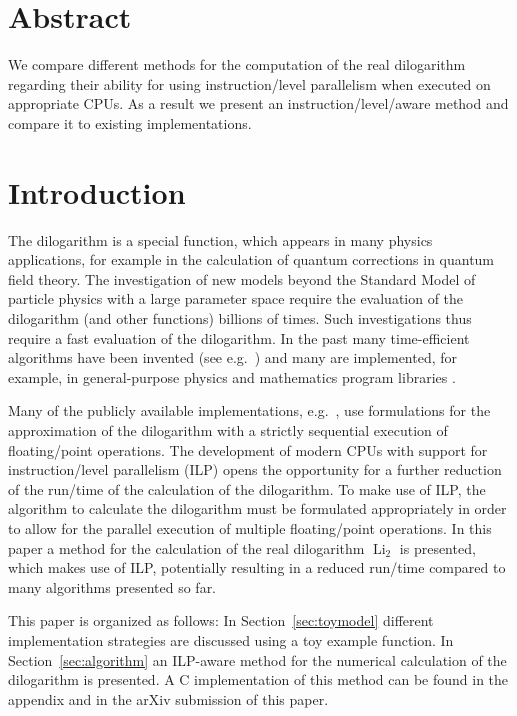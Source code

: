 \documentclass[10pt,DIV16,twocolumn,numbers=noenddot]{scrartcl}
\title{\mytitle}
\author{\myauthor}
\affil{Fachbereich Energie und Biotechnologie, Hochschule Flensburg,\\ Kanzleistra{\ss}e 91--93, 24943 Flensburg, Germany}
\date{\today}
\newcommand{\Li}{\operatorname{Li}_2}
\newcommand{\secref}[1]{Section~\ref{#1}}
\begin{document}
\maketitle

\section*{Abstract}

We compare different methods for the computation of the real
dilogarithm regarding their ability for using instruction\-/level
parallelism when executed on appropriate CPUs.  As a result we present
an instruction\-/level\-/aware method and compare it to existing
implementations.

\section{Introduction}

The dilogarithm \cite{lewin} is a special function, which appears in
many physics applications, for example in the calculation of quantum
corrections in quantum field theory.  The investigation of new models
beyond the Standard Model of particle physics with a large parameter
space require the evaluation of the dilogarithm (and other functions)
billions of times.  Such investigations thus require a fast evaluation
of the dilogarithm.  In the past many time-efficient algorithms have
been invented (see e.g.\ \cite{koelbigDilog,ginsberg,morris}) and many
are implemented, for example, in general-purpose physics and
mathematics program libraries \cite{root,gsl,cephes}.

Many of the publicly available implementations, e.g.\ \cite{root,gsl},
use formulations for the approximation of the dilogarithm with a
strictly sequential execution of floating\-/point operations.  The
development of modern CPUs with support for instruction\-/level
parallelism (ILP) opens the opportunity for a further reduction of the
run\-/time of the calculation of the dilogarithm.  To make use of ILP,
the algorithm to calculate the dilogarithm must be formulated
appropriately in order to allow for the parallel execution of multiple
floating\-/point operations.  In this paper a method for the
calculation of the real dilogarithm $\Li$ is presented, which makes
use of ILP, potentially resulting in a reduced run\-/time compared to
many algorithms presented so far.

This paper is organized as follows: In \secref{sec:toymodel} different
implementation strategies are discussed using a toy example function.
In \secref{sec:algorithm} an ILP-aware method for the numerical
calculation of the dilogarithm is presented.  A C implementation of
this method can be found in the appendix and in the arXiv submission
of this paper.
\end{document}
